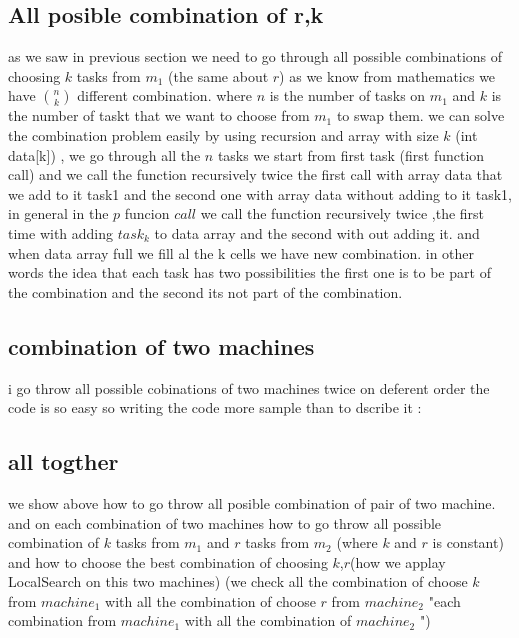 \documentclass[11pt,fullpage]{article}
\begin{document}
\subsection{All posible combination of r,k}
as we saw in previous section we need to go through all possible  combinations of choosing $k$ tasks from $m_1$ (the same about $r$) as we know from mathematics we have  $\binom{n}{k}$ different combination. where $n$ is the number of tasks on $m_1$ and $k$ is the number of taskt that we want to choose from $m_1$ to swap them.\newline
we can solve the combination problem easily by using recursion and array with size $k$  (int data[k]) , we go through all the $n$ tasks we start from first task (first function call) and we call the function recursively twice the first call with array data that we add to it task1 and the second one with array data without adding to it task1, in general in the $p$ funcion $call$ we call the function recursively twice ,the first time with adding $task_k$ to data array and the second with out adding it.
and when data array full we fill al the k cells we have new  combination.\newline
in other words the idea that each task has two possibilities the first one is to be part of the combination and the second its not part of the combination.
\subsection{combination of two machines}
i go throw all possible cobinations of two machines twice on deferent order the code is so easy so writing the code more sample than to dscribe it :\newline 

\subsection{all togther} 
we show above how to go  throw all posible combination of pair of two machine.  and on each  combination of two machines  how to go throw all possible combination of $k$ tasks from $m_1$ and $r$ tasks from $m_2$ (where $k$ and $r$ is constant) and how to choose the best combination of choosing $k$,$r$(how we applay LocalSearch on this two machines) (we check all the combination of choose $k$ from $machine_1$ with all the combination of choose $r$ from $machine_2$ "each combination from $machine_1$ with all the combination of $machine_2$ ")
\end{document}
